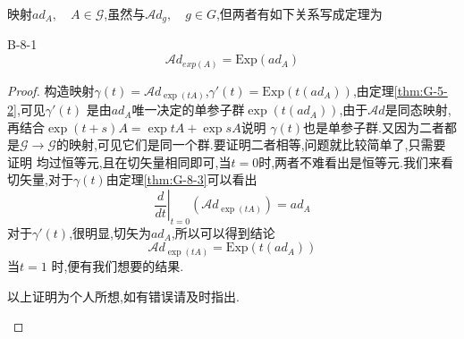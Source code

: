 \documentclass[../main.tex]{subfiles}
\begin{document}
映射$ad_A,\quad A \in \mathscr{G}$,虽然与$\mathscr{A}\!d_g,\quad g\in G$,但两者有如下关系写成定理为
\begin{theorem}
  {}{B-8-1} 
  $$	\mathscr{A}\!d_{exp(A)} = \text{Exp}(ad_A)$$
\end{theorem}
\begin{proof}
	构造映射$\gamma(t) = \mathscr{A}\!d_{\exp(tA)}$,$\gamma'(t) = \text{Exp}(t (ad_A))$,由定理\ref{thm:G-5-2},可见$\gamma'(t)$
	是由$ad_A$唯一决定的单参子群$\exp(t (ad_A))$,由于$\mathscr{A}\!d$是同态映射,再结合$\exp(t+s) A = \exp tA + \exp sA$说明
	$\gamma(t)$也是单参子群.又因为二者都是$\mathscr{G}\rightarrow \mathscr{G}$的映射,可见它们是同一个群.要证明二者相等,问题就比较简单了,只需要证明
	均过恒等元,且在切矢量相同即可,当$t = 0$时,两者不难看出是恒等元.我们来看切矢量,对于$\gamma(t)$由定理\ref{thm:G-8-3}可以看出$$
		\left.\frac{d}{dt}\right|_{t=0} (\mathscr{A}\!d_{\exp(tA)}) = ad_A $$
	对于$\gamma'(t)$,很明显,切矢为$ad_A$,所以可以得到结论$$
		\mathscr{A}\!d_{\exp(tA)} = \text{Exp}(t (ad_A))$$当$t = 1$
	时,便有我们想要的结果.

	\begin{note}以上证明为个人所想,如有错误请及时指出.\end{note}
\end{proof}
\end{document}
